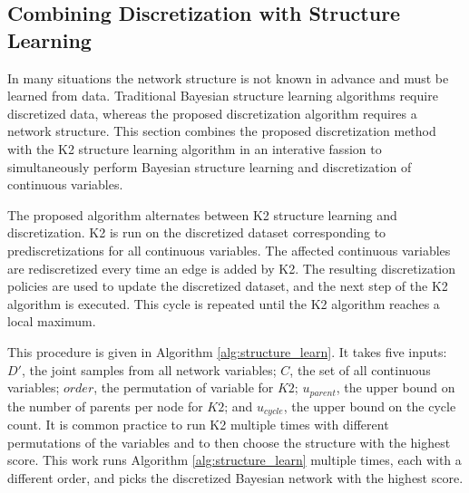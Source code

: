 \subsection{Combining Discretization with Structure Learning}

In many situations the network structure is not known in advance and must be learned from data.
Traditional Bayesian structure learning algorithms require discretized data, whereas the proposed discretization algorithm requires a network structure.
This section combines the proposed discretization method with the K2 structure learning algorithm \citep{K2} in an interative fassion to simultaneously perform Bayesian structure learning and discretization of continuous variables.

The proposed algorithm alternates between K2 structure learning and discretization.
K2 is run on the discretized dataset corresponding to prediscretizations for all continuous variables.
The affected continuous variables are rediscretized every time an edge is added by K2.
The resulting discretization policies are used to update the discretized dataset, and the next step of the K2 algorithm is executed.
This cycle is repeated until the K2 algorithm reaches a local maximum.

This procedure is given in Algorithm \ref{alg:structure_learn}.
It takes five inputs: $D'$, the joint samples from all network variables; $C$, the set of all continuous variables; $order$, the permutation of variable for $K2$; $u_{parent}$, the upper bound on the number of parents per node for $K2$; and $u_{cycle}$, the upper bound on the cycle count.
It is common practice to run K2 multiple times with different permutations of the variables and to then choose the structure with the highest score.
This work runs Algorithm \ref{alg:structure_learn} multiple times, each with a different order, and picks the discretized Bayesian network with the highest score.

